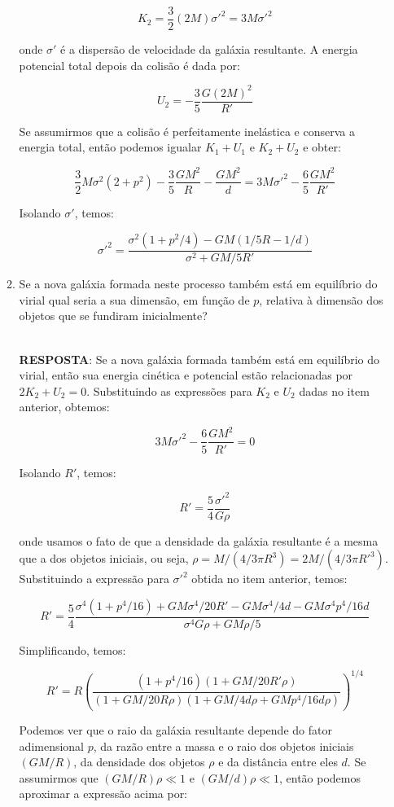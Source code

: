 \documentclass[a4paper,12pt]{article}
\begin{document}
\begin{enumerate}
\begin{enumerate}
$$
K_2 = \frac{3}{2}(2M)\sigma'^2 = 3M\sigma'^2
$$

onde $\sigma'$ é a dispersão de velocidade da galáxia resultante. A energia potencial total depois da colisão é dada por:

$$
U_2 = -\frac{3}{5}\frac{G(2M)^2}{R'}
$$

Se assumirmos que a colisão é perfeitamente inelástica e conserva a energia total, então podemos igualar $K_1 + U_1$ e $K_2 + U_2$ e obter:

$$
\frac{3}{2}M\sigma^2(2+p^2) -\frac{3}{5}\frac{GM^2}{R} - \frac{GM^2}{d} = 3M\sigma'^2 -\frac{6}{5}\frac{GM^2}{R'}
$$

Isolando $\sigma'$, temos:

$$
\sigma'^2 = \frac{\sigma^2(1+p^2/4) - GM(1/5R - 1/d)}{\sigma^2 + GM/5R'}
$$

\noindent\hrulefill

\item Se a nova galáxia formada neste processo também está em equilíbrio do virial qual seria a sua dimensão, em função de $p$, relativa à dimensão dos objetos que se fundiram inicialmente?

\noindent\hrulefill\\\textbf{RESPOSTA}: Se a nova galáxia formada também está em equilíbrio do virial, então sua energia cinética e potencial estão relacionadas por $2K_2 + U_2 = 0$. Substituindo as expressões para $K_2$ e $U_2$ dadas no item anterior, obtemos:

$$
3M\sigma'^2 -\frac{6}{5}\frac{GM^2}{R'} = 0
$$

Isolando $R'$, temos:

$$
R' = \frac{5}{4}\frac{\sigma'^2}{G\rho}
$$

onde usamos o fato de que a densidade da galáxia resultante é a mesma que a dos objetos iniciais, ou seja, $\rho = M/(4/3\pi R^3) = 2M/(4/3\pi R'^3)$. Substituindo a expressão para $\sigma'^2$ obtida no item anterior, temos:

$$
R' = \frac{5}{4}\frac{\sigma^4(1+p^4/16) + GM\sigma^4/20R' - GM\sigma^4/4d - GM\sigma^4p^4/16d }{\sigma^4G\rho + GM\rho/5}
$$

Simplificando, temos:

$$
R' = R\left(\frac{(1+p^4/16)(1+GM/20R'\rho)}{(1+GM/20R\rho)(1+GM/4d\rho+GMp^4/16d\rho)}\right)^{1/4}
$$

Podemos ver que o raio da galáxia resultante depende do fator adimensional $p$, da razão entre a massa e o raio dos objetos iniciais $(GM/R)$, da densidade dos objetos $\rho$ e da distância entre eles $d$. Se assumirmos que $(GM/R)\rho \ll 1$ e $(GM/d)\rho \ll 1$, então podemos aproximar a expressão acima por:


\end{enumerate}
\end{enumerate}
\end{document}
